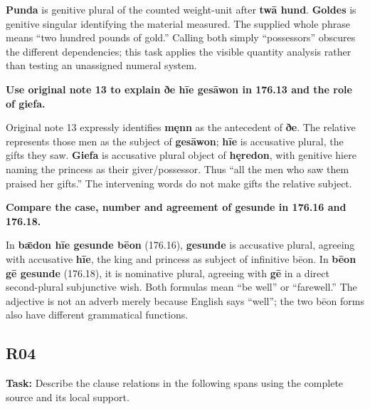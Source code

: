 \textbf{Punda} is genitive plural of the counted weight-unit after \textbf{twā hund}. \textbf{Goldes} is genitive singular identifying the material measured. The supplied whole phrase means “two hundred pounds of gold.” Calling both simply “possessors” obscures the different dependencies; this task applies the visible quantity analysis rather than testing an unassigned numeral system.

\textbf{Use original note 13 to explain ðe hīe gesāwon in 176.13 and the role of giefa.}

Original note 13 expressly identifies \textbf{męnn} as the antecedent of \textbf{ðe}. The relative represents those men as the subject of \textbf{gesāwon}; \textbf{hīe} is accusative plural, the gifts they saw. \textbf{Giefa} is accusative plural object of \textbf{hęredon}, with genitive hiere naming the princess as their giver/\allowbreak{}possessor. Thus “all the men who saw them praised her gifts.” The intervening words do not make gifts the relative subject.

\textbf{Compare the case, number and agreement of gesunde in 176.16 and 176.18.}

In \textbf{bǣdon hīe gesunde bēon} (176.16), \textbf{gesunde} is accusative plural, agreeing with accusative \textbf{hīe}, the king and princess as subject of infinitive bēon. In \textbf{bēon gē gesunde} (176.18), it is nominative plural, agreeing with \textbf{gē} in a direct second-plural subjunctive wish. Both formulas mean “be well” or “farewell.” The adjective is not an adverb merely because English says “well”; the two bēon forms also have different grammatical functions.

\subsection*{R04}

\textbf{Task:} Describe the clause relations in the following spans using the complete source and its local support.

